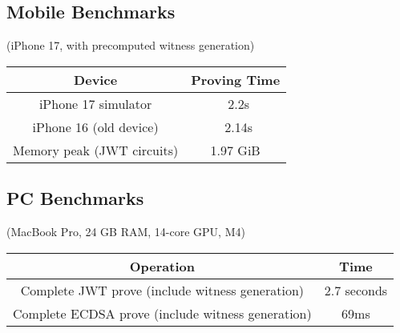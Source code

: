 \subsection{Mobile Benchmarks}
(iPhone 17, with precomputed witness generation)

\begin{tabular}{|c|c|}
Device                    & Proving Time \\
\hline
iPhone 17 simulator       & ~2.2s        \\
iPhone 16 (old device)    & ~2.14s       \\
Memory peak (JWT circuits)& 1.97 GiB     
\end{tabular}

\subsection{PC Benchmarks}
(MacBook Pro, 24 GB RAM, 14-core GPU, M4)

\begin{tabular}{|c|c|}
Operation                                         & Time        \\
\hline
Complete JWT prove (include witness generation)   & 2.7 seconds \\
Complete ECDSA prove (include witness generation) & 69ms        
\end{tabular}


